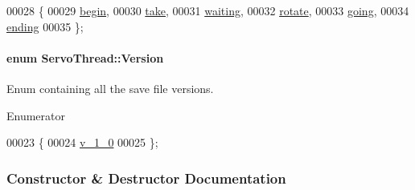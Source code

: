 \begin{DoxyCode}
00028                 \{
00029         \hyperlink{a00009_a3c23985ab5e94c14f5e6fca0a9338f9ca1dad1d6f2c4b2b0a2eb62a938a9e7f51}{begin},
00030         \hyperlink{a00009_a3c23985ab5e94c14f5e6fca0a9338f9caf04ef179dc6409795e9d3ade571c3515}{take},
00031         \hyperlink{a00009_a3c23985ab5e94c14f5e6fca0a9338f9caaddba813e34d7dd76102738562a90054}{waiting},
00032         \hyperlink{a00009_a3c23985ab5e94c14f5e6fca0a9338f9ca78f8ef8a596e79d3e778ef9052461658}{rotate},
00033         \hyperlink{a00009_a3c23985ab5e94c14f5e6fca0a9338f9cac8deab3874847d5e02a4593a81de8ba3}{going},
00034         \hyperlink{a00009_a3c23985ab5e94c14f5e6fca0a9338f9ca08a8e15b95d1cf505aab103927b3f832}{ending}
00035     \};
\end{DoxyCode}
\hypertarget{a00009_aeccce0ac6a969e2ee7cbe91687e2d085}{}
\paragraph[{Version}]{\setlength{\rightskip}{0pt plus 5cm}enum {\bf Servo\+Thread\+::\+Version}\hspace{0.3cm}{\ttfamily [private]}}\label{a00009_aeccce0ac6a969e2ee7cbe91687e2d085}


Enum containing all the save file versions. 

\begin{Desc}
\item[Enumerator]\par
\begin{description}
\item[{\em 
\hypertarget{a00009_aeccce0ac6a969e2ee7cbe91687e2d085a319b6bf2cb120faeefbd0a5118ece7e3}{}v\+\_\+1\+\_\+0\label{a00009_aeccce0ac6a969e2ee7cbe91687e2d085a319b6bf2cb120faeefbd0a5118ece7e3}
}]\end{description}
\end{Desc}

\begin{DoxyCode}
00023     \{
00024         \hyperlink{a00009_aeccce0ac6a969e2ee7cbe91687e2d085a319b6bf2cb120faeefbd0a5118ece7e3}{v\_1\_0}
00025     \};
\end{DoxyCode}


\subsubsection{Constructor \& Destructor Documentation}
\hypertarget{a00009_af021de9817b11968dd627186e9e05a71}{}
